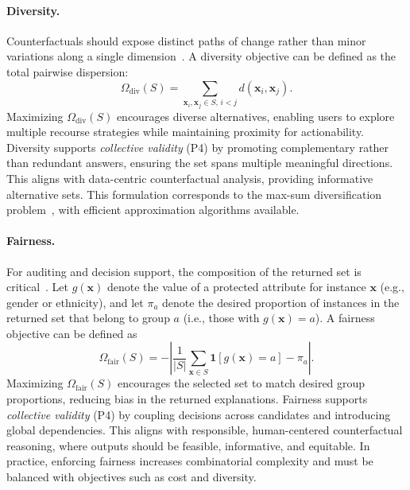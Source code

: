 \paragraph{Diversity.}
Counterfactuals should expose distinct paths of change rather than minor variations along a single dimension~\cite{laugel2023achieving}. A diversity objective can be defined as the total pairwise dispersion:
\begingroup\small
\begin{equation}
    \Omega_{\text{div}}(S) 
    = \sum_{\mathbf{x}_i, \mathbf{x}_j \in S,\, i<j} d(\mathbf{x}_i, \mathbf{x}_j).
\end{equation}
\endgroup
Maximizing $\Omega_{\text{div}}(S)$ encourages diverse alternatives, enabling users to explore multiple recourse strategies while maintaining proximity for actionability. Diversity supports \emph{collective validity} (P4) by promoting complementary rather than redundant answers, ensuring the set spans multiple meaningful directions. This aligns with data-centric counterfactual analysis, providing informative alternative sets. This formulation corresponds to the max-sum diversification problem~\cite{borodin2017max}, with efficient approximation algorithms available.

\paragraph{Fairness.}
For auditing and decision support, the composition of the returned set is critical~\cite{kusner2017counterfactual}. Let $g(\mathbf{x})$ denote the value of a protected attribute for instance $\mathbf{x}$ (e.g., gender or ethnicity), and let $\pi_a$ denote the desired proportion of instances in the returned set that belong to group $a$ (i.e., those with $g(\mathbf{x}) = a$). A fairness objective can be defined as
\begingroup\small
\begin{equation}
\Omega_{\text{fair}}(S)
=
-
\left|
\frac{1}{|S|}\sum_{\mathbf{x}\in S}\mathbf{1}[g(\mathbf{x})=a] - \pi_a
\right|.
\end{equation}
\endgroup
Maximizing $\Omega_{\text{fair}}(S)$ encourages the selected set to match desired group proportions, reducing bias in the returned explanations. Fairness supports \emph{collective validity} (P4) by coupling decisions across candidates and introducing global dependencies. This aligns with responsible, human-centered counterfactual reasoning, where outputs should be feasible, informative, and equitable. In practice, enforcing fairness increases combinatorial complexity and must be balanced with objectives such as cost and diversity.
